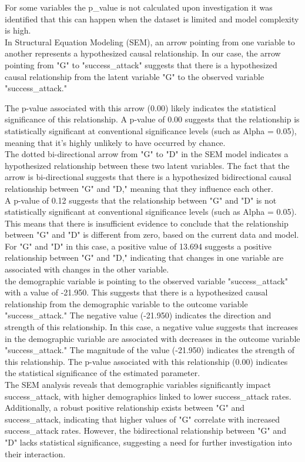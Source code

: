 \documentclass[10pt, conference, compsocconf]{IEEEtran}
\begin{document}
	 
	 For some variables the p\_value is not calculated upon investigation it was identified that this can happen when the dataset is limited and model complexity is high.\\
	 \newpage
	 In Structural Equation Modeling (SEM), an arrow pointing from one variable to another represents a hypothesized causal relationship. In our case, the arrow pointing from "G" to "success\_attack" suggests that there is a hypothesized causal relationship from the latent variable "G" to the observed variable "success\_attack."
	 
	 The p-value associated with this arrow (0.00) likely indicates the statistical significance of this relationship. A p-value of 0.00 suggests that the relationship is statistically significant at conventional significance levels (such as Alpha = 0.05), meaning that it's highly unlikely to have occurred by chance.\\
	 The dotted bi-directional arrow from "G" to "D" in the SEM model indicates a hypothesized relationship between these two latent variables. The fact that the arrow is bi-directional suggests that there is a hypothesized bidirectional causal relationship between "G" and "D," meaning that they influence each other.\\
	 A p-value of 0.12 suggests that the relationship between "G" and "D" is not statistically significant at conventional significance levels (such as Alpha = 0.05). This means that there is insufficient evidence to conclude that the relationship between "G" and "D" is different from zero, based on the current data and model.\\
	 For "G" and "D" in this case, a positive value of 13.694 suggests a positive relationship between "G" and "D," indicating that changes in one variable are associated with changes in the other variable.\\
	 the demographic variable is pointing to the observed variable "success\_attack" with a value of -21.950. This suggests that there is a hypothesized causal relationship from the demographic variable to the outcome variable "success\_attack."
	The negative value (-21.950) indicates the direction and strength of this relationship. In this case, a negative value suggests that increases in the demographic variable are associated with decreases in the outcome variable "success\_attack." The magnitude of the value (-21.950) indicates the strength of this relationship. The p-value associated with this relationship (0.00) indicates the statistical significance of the estimated parameter.\\
	The SEM analysis reveals that demographic variables significantly impact success\_attack, with higher demographics linked to lower success\_attack rates. Additionally, a robust positive relationship exists between "G" and success\_attack, indicating that higher values of "G" correlate with increased success\_attack rates. However, the bidirectional relationship between "G" and "D" lacks statistical significance, suggesting a need for further investigation into their interaction. 
	
\end{document}
